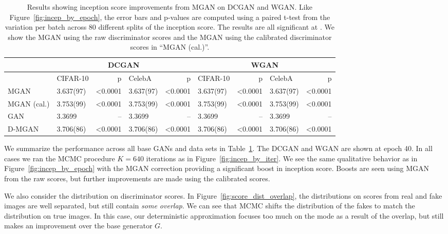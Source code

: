 \documentclass{article}
\begin{document}
\begin{table}[htbp]
\centering
    \caption{{\small
    Results showing inception score improvements from MGAN on DCGAN and WGAN\@.
    Like Figure~\ref{fig:incep_by_epoch}, the error bars and p-values are computed using a paired t-test from the variation per batch across 80 different splits of the inception score.
    The results are all significant at .
    We show the MGAN using the raw discriminator scores and the MGAN using the calibrated discriminator scores in ``MGAN (cal.)''.
    }}
    \label{tbl:inception}
{\scriptsize
\begin{tabular}{|l|l|r|l|r||l|r|l|r|}
\toprule
~                 & \multicolumn{4}{c}{DCGAN}                               & \multicolumn{4}{c}{WGAN} \\
\toprule
~                 & CIFAR-10         &      p   & CelebA         &      p   & CIFAR-10        &      p   & CelebA        &      p \\
\midrule
MGAN              &        3.637(97) &  <0.0001 &      3.637(97) &  <0.0001 &       3.637(97) &  <0.0001 &     3.637(97) &  <0.0001 \\
MGAN (cal.)       &        3.753(99) &  <0.0001 &      3.753(99) &  <0.0001 &       3.753(99) &  <0.0001 &     3.753(99) &  <0.0001 \\
GAN               &        3.3699    &       -- &      3.3699    &       -- &       3.3699    &       -- &     3.3699    &       -- \\
D-MGAN            &        3.706(86) &  <0.0001 &      3.706(86) &  <0.0001 &       3.706(86) &  <0.0001 &     3.706(86) &  <0.0001 \\
\bottomrule
\end{tabular}
}
\end{table}

We summarize the performance across all base GANs and data sets in Table~\ref{tbl:inception}.
The DCGAN and WGAN are shown at epoch 40.  %
In all cases we ran the MCMC procedure $K=640$ iterations as in Figure~\ref{fig:incep_by_iter}.
We see the same qualitative behavior as in Figure~\ref{fig:incep_by_epoch} with the MGAN correction providing a significant boost in inception score.
Boosts are seen using MGAN from the raw scores, but further improvements are made using the calibrated scores.

We also consider the distribution on discriminator scores.
In Figure~\ref{fig:score_dist_overlap}, the distributions on scores from real and fake images are well separated, but still contain \emph{some overlap}.
We can see that MCMC shifts the distribution of the fakes to match the distribution on true images.
In this case, our deterministic approximation focuses too much on the mode as a result of the overlap, but still makes an improvement over the base generator $G$.
\end{document}
